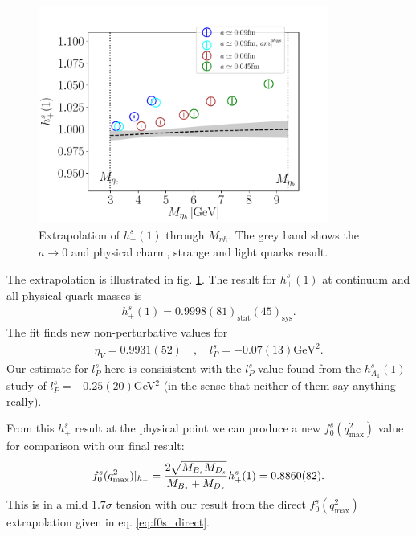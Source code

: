 \begin{figure}[htb!]
  \begin{center}
    \includegraphics[width=0.85\textwidth]{images/BsDs/hplus_vsmh.pdf}
    \caption{Extrapolation of $h^s_+(1)$ through $M_{\eta{h}}$. The grey band shows the $a\to 0$ and physical charm, strange and light quarks result. \label{fig:hplus_extrap}}
  \end{center}
\end{figure}

The extrapolation is illustrated in fig. \ref{fig:hplus_extrap}. The result for $h^s_+(1)$ at continuum and all physical quark masses is
\begin{align}
  h_+^s(1) = 0.9998(81)_{\text{stat}}(45)_{\text{sys}}.
\end{align}
The fit finds new non-perturbative values for
\begin{align}
  \eta_V = 0.9931(52) \quad,\quad l_P^s = -0.07(13) \text{GeV}^2.
\end{align}
Our estimate for $l_P^s$ here is consisistent with the $l_P^s$ value found from the $h^s_{A_1}(1)$ study of $l_P^s=-0.25(20)$GeV$^2$ (in the sense that neither of them say anything really).

From this $h^s_+$ result at the physical point we can produce a new $f^s_0(q^2_{\text{max}})$ value for comparison with our final result:
\begin{align}
  f^s_0(q^2_{\text{max}})|_{h_+} = {2\sqrt{ M_{B_s}M_{D_s} }\over M_{B_s}+M_{D_s}} h^s_+(1) = 0.8860(82).
\end{align}
This is in a mild $1.7\sigma$ tension with our result from the direct $f^s_0(q^2_{\text{max}})$ extrapolation given in eq. \eqref{eq:f0s_direct}.

